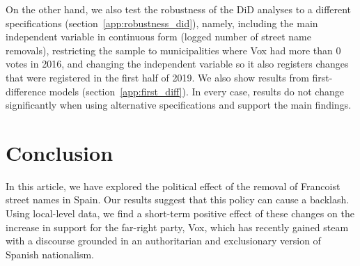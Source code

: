\documentclass[12pt, notitlepage]{article}
\begin{document}
On the other hand, we also test the robustness of the DiD analyses to a different specifications (section~\ref{app:robustness_did}), namely, including the main independent variable in continuous form (logged number of street name removals), restricting the sample to municipalities where Vox had more than 0 votes in 2016, and changing the independent variable so it also registers changes that were registered in the first half of 2019.
We also show results from first-difference models (section~\ref{app:first_diff}).
In every case, results do not change significantly when using alternative specifications and support the main findings.

\section*{Conclusion}

In this article, we have explored the political effect of the removal of Francoist street names in Spain.
Our results suggest that this policy can cause a backlash. Using local-level data, we find a short-term positive effect of these changes on the increase in support for the far-right party, Vox, which has recently gained steam with a discourse grounded in an authoritarian and exclusionary version of Spanish nationalism.
\end{document}
